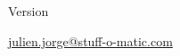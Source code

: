 \begin{titlepage}

  \pagestyle{empty}
  \centering

  \makeatletter

  \vspace*{\fill}
  \vspace{-9cm}

  {\Huge\bfseries \@title}

  \vspace{1cm}
  Version \version

  \vfill

  \@author

  \href{mailto:julien.jorge@stuff-o-matic.com}{julien.jorge@stuff-o-matic.com}

  \makeatother
\end{titlepage}
